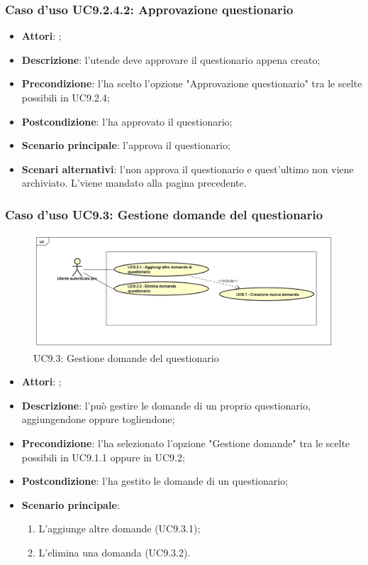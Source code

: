 			\subsubsection{Caso d'uso UC9.2.4.2: Approvazione questionario}
			\label{UC9.2.4.2}
			\begin{itemize}
				\item \textbf{Attori}: \uaupro;
				\item \textbf{Descrizione}: l'utende deve approvare il questionario appena creato;
				\item \textbf{Precondizione}: l'\uaupro ha scelto l'opzione "Approvazione questionario" tra le scelte possibili in UC9.2.4; 
				\item \textbf{Postcondizione}: l'\uaupro ha approvato il questionario;
				\item \textbf{Scenario principale}: l'\uaupro approva il questionario;
				\item \textbf{Scenari alternativi}: l'\uaupro non approva il questionario e quest'ultimo non viene archiviato. L'\uaupro viene mandato alla pagina precedente.
			\end{itemize}				
	 
	 \subsubsection{Caso d'uso UC9.3: Gestione domande del questionario}
	 \label{UC9.3}
	 \begin{figure}[h]
	 	\centering
	 	\includegraphics[scale=0.5,keepaspectratio]{UML/UC9_3.png}
	 	\caption{UC9.3: Gestione domande del questionario}
	 \end{figure}
	 \FloatBarrier
	 \begin{itemize}
	 	\item \textbf{Attori}: \uaupro;
	 	\item \textbf{Descrizione}: l'\uaupro può gestire le domande di un proprio questionario, aggiungendone oppure togliendone;
	 	\item \textbf{Precondizione}: l'\uaupro ha selezionato l'opzione "Gestione domande" tra le scelte possibili in UC9.1.1 oppure in UC9.2;
	 	\item \textbf{Postcondizione}: l'\uaupro ha gestito le domande di un questionario;
	 	\item \textbf{Scenario principale}: 
	 	\begin{enumerate}
	 		\item L'\uaupro aggiunge altre domande (UC9.3.1);
	 		\item L'\uaupro elimina una domanda (UC9.3.2).
	 	\end{enumerate}
	 \end{itemize}
	 

